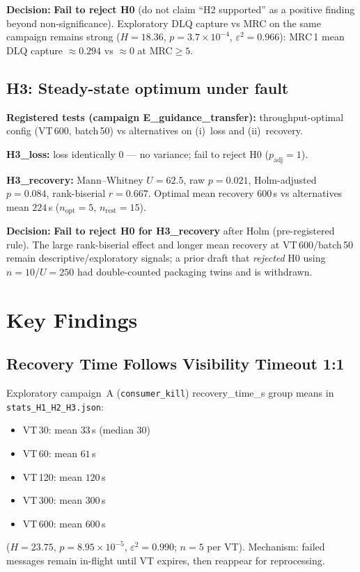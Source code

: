 \textbf{Decision:} \textbf{Fail to reject H0} (do not claim ``H2 supported'' as a positive finding beyond non-significance). Exploratory DLQ capture vs MRC on the same campaign remains strong ($H=18.36$, $p=3.7\times10^{-4}$, $\varepsilon^2=0.966$): MRC\,1 mean DLQ capture $\approx0.294$ vs $\approx0$ at MRC$\ge5$.

\subsection{H3: Steady-state optimum under fault}

\textbf{Registered tests (campaign E\_guidance\_transfer):} throughput-optimal config (VT\,600, batch\,50) vs alternatives on (i)~loss and (ii)~recovery.

\textbf{H3\_loss:} loss identically 0 --- no variance; fail to reject H0 ($p_{\mathrm{adj}}=1$).

\textbf{H3\_recovery:} Mann--Whitney $U=62.5$, raw $p=0.021$, Holm-adjusted $p=0.084$, rank-biserial $r=0.667$. Optimal mean recovery $600$\,s vs alternatives mean $224$\,s ($n_{\mathrm{opt}}=5$, $n_{\mathrm{rest}}=15$).

\textbf{Decision:} \textbf{Fail to reject H0 for H3\_recovery} after Holm (pre-registered rule). The large rank-biserial effect and longer mean recovery at VT\,600/batch\,50 remain descriptive/exploratory signals; a prior draft that \emph{rejected} H0 using $n=10$/$U=250$ had double-counted packaging twins and is withdrawn.
\section{Key Findings}

\subsection{Recovery Time Follows Visibility Timeout 1:1}

Exploratory campaign~A (\texttt{consumer\_kill}) recovery\_time\_s group means in \texttt{stats\_H1\_H2\_H3.json}:
\begin{itemize}
    \item VT\,30: mean $33$\,s (median $30$)
    \item VT\,60: mean $61$\,s
    \item VT\,120: mean $120$\,s
    \item VT\,300: mean $300$\,s
    \item VT\,600: mean $600$\,s
\end{itemize}
($H=23.75$, $p=8.95\times10^{-5}$, $\varepsilon^2=0.990$; $n=5$ per VT). Mechanism: failed messages remain in-flight until VT expires, then reappear for reprocessing.

